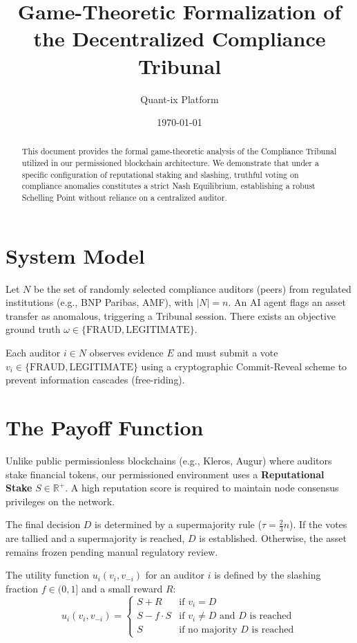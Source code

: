 \documentclass[11pt,a4paper]{article}
\title{Game-Theoretic Formalization of the Decentralized Compliance Tribunal}
\author{Quant-ix Platform}
\date{\today}
\begin{document}
\maketitle

\begin{abstract}
This document provides the formal game-theoretic analysis of the Compliance Tribunal utilized in our permissioned blockchain architecture. We demonstrate that under a specific configuration of reputational staking and slashing, truthful voting on compliance anomalies constitutes a strict Nash Equilibrium, establishing a robust Schelling Point without reliance on a centralized auditor.
\end{abstract}

\section{System Model}
Let $N$ be the set of randomly selected compliance auditors (peers) from regulated institutions (e.g., BNP Paribas, AMF), with $|N| = n$.
An AI agent flags an asset transfer as anomalous, triggering a Tribunal session. 
There exists an objective ground truth $\omega \in \{\text{FRAUD}, \text{LEGITIMATE}\}$.

Each auditor $i \in N$ observes evidence $E$ and must submit a vote $v_i \in \{\text{FRAUD}, \text{LEGITIMATE}\}$ using a cryptographic Commit-Reveal scheme to prevent information cascades (free-riding).

\section{The Payoff Function}
Unlike public permissionless blockchains (e.g., Kleros, Augur) where auditors stake financial tokens, our permissioned environment uses a \textbf{Reputational Stake} $S \in \mathbb{R}^+$. A high reputation score is required to maintain node consensus privileges on the network.

The final decision $D$ is determined by a supermajority rule ($\tau = \frac{2}{3}n$).
If the votes are tallied and a supermajority is reached, $D$ is established. Otherwise, the asset remains frozen pending manual regulatory review.

The utility function $u_i(v_i, v_{-i})$ for an auditor $i$ is defined by the slashing fraction $f \in (0, 1]$ and a small reward $R$:
\begin{equation}
u_i(v_i, v_{-i}) = 
\begin{cases} 
S + R & \text{if } v_i = D \\
S - f \cdot S & \text{if } v_i \neq D \text{ and } D \text{ is reached}\\
S & \text{if no majority } D \text{ is reached}
\end{cases}
\end{equation}
\end{document}

